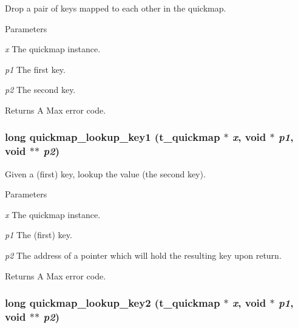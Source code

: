 Drop a pair of keys mapped to each other in the quickmap. 
\begin{DoxyParams}{Parameters}
\item[{\em x}]The quickmap instance. \item[{\em p1}]The first key. \item[{\em p2}]The second key. \end{DoxyParams}
\begin{DoxyReturn}{Returns}
A Max error code. 
\end{DoxyReturn}
\hypertarget{group__quickmap_ga2320c067e7af6bb5f3ec25cfe3155fd1}{
\subsubsection[{quickmap\_\-lookup\_\-key1}]{\setlength{\rightskip}{0pt plus 5cm}long quickmap\_\-lookup\_\-key1 ({\bf t\_\-quickmap} $\ast$ {\em x}, \/  void $\ast$ {\em p1}, \/  void $\ast$$\ast$ {\em p2})}}
\label{group__quickmap_ga2320c067e7af6bb5f3ec25cfe3155fd1}


Given a (first) key, lookup the value (the second key). 
\begin{DoxyParams}{Parameters}
\item[{\em x}]The quickmap instance. \item[{\em p1}]The (first) key. \item[{\em p2}]The address of a pointer which will hold the resulting key upon return. \end{DoxyParams}
\begin{DoxyReturn}{Returns}
A Max error code. 
\end{DoxyReturn}
\hypertarget{group__quickmap_ga5b3d684268e80a4fc51e226a50ecb2ad}{
\subsubsection[{quickmap\_\-lookup\_\-key2}]{\setlength{\rightskip}{0pt plus 5cm}long quickmap\_\-lookup\_\-key2 ({\bf t\_\-quickmap} $\ast$ {\em x}, \/  void $\ast$ {\em p1}, \/  void $\ast$$\ast$ {\em p2})}}
\label{group__quickmap_ga5b3d684268e80a4fc51e226a50ecb2ad}



